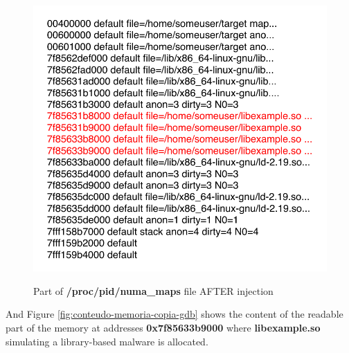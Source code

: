 \documentclass[10pt,journal,compsoc]{IEEEtran}
\newcommand{\marcos}[1]{{\color{green}{MARCOS: #1}}}
\begin{document}
\begin{figure}[htb!]
\footnotesize
\caption{Part of \textbf{/proc/pid/numa\_maps} file AFTER injection }
\includegraphics[center,scale=0.60]{apos-injecao.pdf}
\centering
\label{fig:apos-injecao}
\end{figure}

And Figure \ref{fig:conteudo-memoria-copia-gdb} shows the content of the readable part of the memory at addresses \textbf{0x7f85633b9000} where \textbf{libexample.so} simulating a library-based malware is allocated.
%
\end{document}
